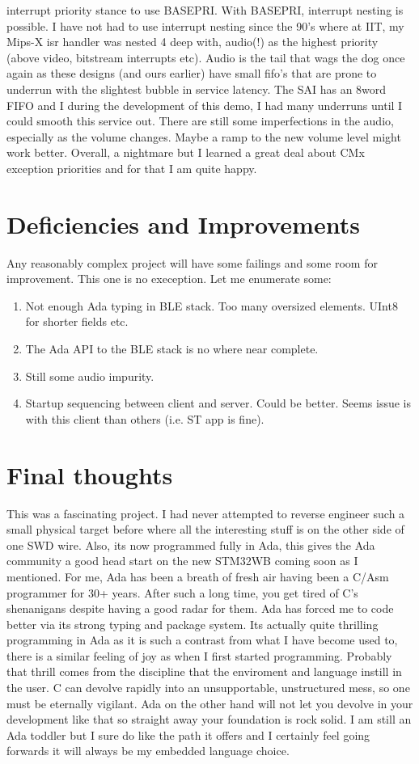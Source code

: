 \documentclass[11pt]{article}
\numberwithin{figure}{section}
\begin{document}
interrupt priority stance to use BASEPRI. With BASEPRI, interrupt
nesting is possible. I have not had to use interrupt nesting since the
90's where at IIT, my Mips-X isr handler was nested 4 deep with,
audio(!) as the highest priority (above video, bitstream interrupts
etc). Audio is the tail that wags the dog once again as these designs
(and ours earlier) have small fifo's that are prone to underrun with
the slightest bubble in service latency. The SAI has an 8word FIFO and
I during the development of this demo, I had many underruns until I
could smooth this service out. There are still some imperfections in
the audio, especially as the volume changes. Maybe a ramp to the new
volume level might work better. Overall, a nightmare but I learned a
great deal about CMx exception priorities and for that I am quite
happy.
\section{Deficiencies and Improvements}
Any reasonably complex project will have some failings and some room
for improvement. This one is no exeception. Let me enumerate some:
\begin{enumerate}[label=(\alph*)]
\item Not enough Ada typing in BLE stack. Too many oversized
  elements. UInt8 for shorter fields etc.
\item The Ada API to the BLE stack is no where near complete.
\item Still some audio impurity.
\item Startup sequencing between client and server. Could be
  better. Seems issue is with this client than others (i.e. ST app is
  fine).
\end{enumerate}


\section{Final thoughts}
This was a fascinating project. I had never attempted to reverse
engineer such a small physical target before where all the interesting
stuff is on the other side of one SWD wire. Also, its now programmed
fully in Ada, this gives the Ada community a good head start on the
new STM32WB coming soon as I mentioned. For me, Ada has been a breath
of fresh air having been a C/Asm programmer for 30+ years. After such
a long time, you get tired of C's shenanigans despite having a good
radar for them. Ada has forced me to code better via its strong typing
and package system. Its actually quite thrilling programming in Ada as
it is such a contrast from what I have become used to, there is a
similar feeling of joy as when I first started programming. Probably
that thrill comes from the discipline that the enviroment and language
instill in the user. C can devolve rapidly into an unsupportable,
unstructured mess, so one must be eternally vigilant. Ada on the other
hand will not let you devolve in your development like that so
straight away your foundation is rock solid. I am still an Ada toddler
but I sure do like the path it offers and I certainly feel going
forwards it will always be my embedded language choice.
\end{document}
